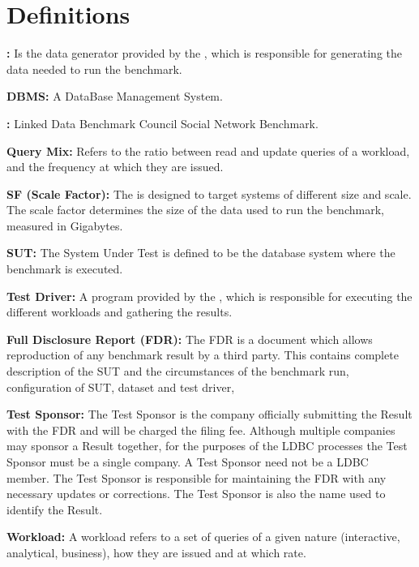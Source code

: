 \chapter*{Definitions}

{\flushleft \textbf{\datagen:}} Is the data generator provided by the \ldbcfinbench, which
is responsible for generating the data needed to run the benchmark.

{\flushleft \textbf{DBMS:}} A DataBase Management System. 

{\flushleft \textbf{\ldbcfinbench:}} Linked Data Benchmark Council Social Network Benchmark. 

{\flushleft \textbf{Query Mix:}} Refers to the ratio between read and update queries
of a workload, and the frequency at which they are issued.

{\flushleft \textbf{SF (Scale Factor):}} The \ldbcfinbench is designed to target systems of
different size and scale. The scale factor determines the size of the data used
to run the benchmark, measured in Gigabytes.


{\flushleft \textbf{SUT:}} The System Under Test  is defined
to be the database system where the benchmark is executed.


{\flushleft \textbf{Test Driver:}}  A program provided by the \ldbcfinbench, which
is responsible for executing the different workloads and gathering the results.

{\flushleft \textbf{Full Disclosure Report (FDR):}} The FDR is a document which allows reproduction of any benchmark result by a third party. This contains complete description of the SUT and the circumstances of the benchmark run, \eg configuration of SUT, dataset and test driver, \etc

{\flushleft \textbf{Test Sponsor:}} The Test Sponsor is the company officially
submitting the Result with the FDR and will be charged the filing fee. Although
multiple companies may sponsor a Result together, for the purposes of the LDBC
processes the Test Sponsor must be a single company. A Test Sponsor need not be
a LDBC member. The Test Sponsor is responsible for maintaining the FDR with any
necessary updates or corrections. The Test Sponsor is also the name used to
identify the Result.

%



{\flushleft \textbf{Workload:}} A workload refers to a set of queries of a given nature
(\ie interactive, analytical, business), how they are issued and at which rate.
